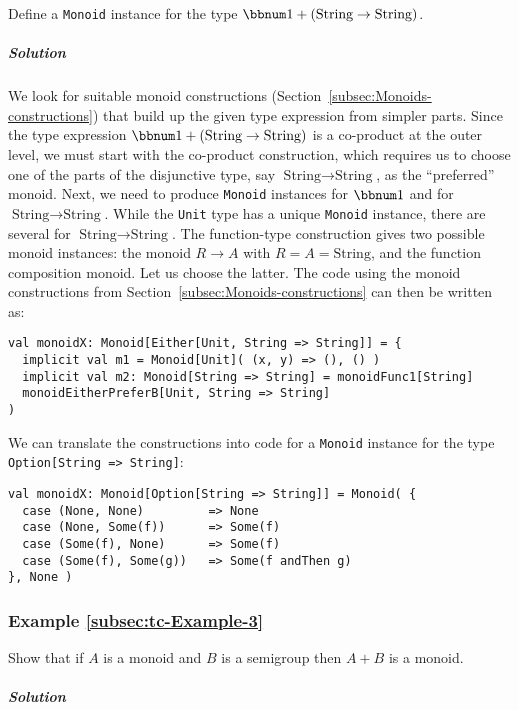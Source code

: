Define a \lstinline!Monoid! instance for the type $\bbnum 1+(\text{String}\rightarrow\text{String})$.

\subparagraph{Solution}

We look for suitable monoid constructions (Section~\ref{subsec:Monoids-constructions})
that build up the given type expression from simpler parts. Since
the type expression $\bbnum 1+(\text{String}\rightarrow\text{String})$
is a co-product at the outer level, we must start with the co-product
construction, which requires us to choose one of the parts of the
disjunctive type, say $\text{String}\rightarrow\text{String}$, as
the \textsf{``}preferred\textsf{''} monoid. Next, we need to produce \lstinline!Monoid!
instances for $\bbnum 1$ and for $\text{String}\rightarrow\text{String}$.
While the \lstinline!Unit! type has a unique \lstinline!Monoid!
instance, there are several for $\text{String}\rightarrow\text{String}$.
The function-type construction gives two possible monoid instances:
the monoid $R\rightarrow A$ with $R=A=\text{String}$, and the function
composition monoid. Let us choose the latter. The code using the monoid
constructions from Section~\ref{subsec:Monoids-constructions} can
then be written as:
\begin{lstlisting}
val monoidX: Monoid[Either[Unit, String => String]] = {
  implicit val m1 = Monoid[Unit]( (x, y) => (), () )
  implicit val m2: Monoid[String => String] = monoidFunc1[String]
  monoidEitherPreferB[Unit, String => String]
)
\end{lstlisting}
We can translate the constructions into code for a \lstinline!Monoid!
instance for the type \lstinline!Option[String => String]!:
\begin{lstlisting}
val monoidX: Monoid[Option[String => String]] = Monoid( {
  case (None, None)         => None
  case (None, Some(f))      => Some(f)
  case (Some(f), None)      => Some(f)
  case (Some(f), Some(g))   => Some(f andThen g)
}, None )
\end{lstlisting}


\subsubsection{Example \label{subsec:tc-Example-3}\ref{subsec:tc-Example-3}}

Show that if $A$ is a monoid and $B$ is a semigroup then $A+B$
is a monoid.

\subparagraph{Solution}


